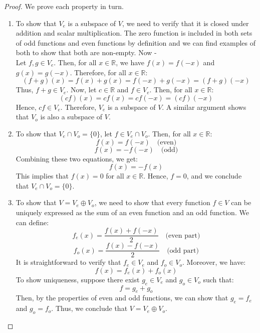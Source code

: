 \documentclass[openany]{book}
\begin{document}
\begin{proof}
    We prove each property in turn.
    \begin{enumerate}
        \item To show that $V_e$ is a subspace of $V$, we need to verify that it is closed under addition and scalar multiplication. The zero function is included in both sets of odd functions and even functions by definition and we can find examples of both to show that both are non-empty. Now - \\
        Let $f, g \in V_e$. Then, for all $x \in \mathbb{R}$, we have $f(x) = f(-x)$ and $g(x) = g(-x)$. Therefore, for all $x \in \mathbb{R}$:
        $$(f + g)(x) = f(x) + g(x) = f(-x) + g(-x) = (f + g)(-x)$$
        Thus, $f + g \in V_e$. Now, let $c \in \mathbb{R}$ and $f \in V_e$. Then, for all $x \in \mathbb{R}$:
        $$(cf)(x) = c f(x) = c f(-x) = (cf)(-x)$$
        Hence, $cf \in V_e$. Therefore, $V_e$ is a subspace of $V$. A similar argument shows that $V_o$ is also a subspace of $V$.

        \item To show that $V_e \cap V_o = \{0\}$, let $f \in V_e \cap V_o$. Then, for all $x \in \mathbb{R}$:
        $$f(x) = f(-x) \quad \text{(even)}$$
        $$f(x) = -f(-x) \quad \text{(odd)}$$
        Combining these two equations, we get:
        $$f(x) = -f(x)$$
        This implies that $f(x) = 0$ for all $x \in \mathbb{R}$. Hence, $f = 0$, and we conclude that $V_e \cap V_o = \{0\}$.

        \item To show that $V = V_e \oplus V_o$, we need to show that every function $f \in V$ can be uniquely expressed as the sum of an even function and an odd function. We can define:
        $$f_e(x) = \frac{f(x) + f(-x)}{2} \quad \text{(even part)}$$
        $$f_o(x) = \frac{f(x) - f(-x)}{2} \quad \text{(odd part)}$$
        It is straightforward to verify that $f_e \in V_e$ and $f_o \in V_o$. Moreover, we have:
        $$f(x) = f_e(x) + f_o(x)$$
        To show uniqueness, suppose there exist $g_e \in V_e$ and $g_o \in V_o$ such that:
        $$f = g_e + g_o$$
        Then, by the properties of even and odd functions, we can show that $g_e = f_e$ and $g_o = f_o$. Thus, we conclude that $V = V_e \oplus V_o$.
    \end{enumerate}
\end{proof}
\end{document}
